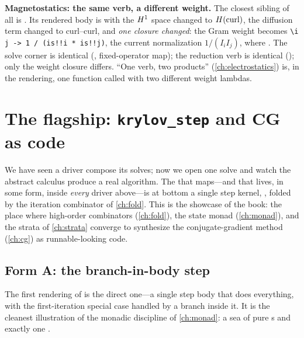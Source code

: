 \begin{notationbox}
\textbf{Magnetostatics: the same verb, a different weight.} The closest sibling of
all is . Its rendered body is  with the
$H^1$ space changed to $H(\mathrm{curl})$, the diffusion term changed to curl--curl, and
\emph{one closure changed}: the Gram weight becomes
\lstinline[style=l4style]|\i j -> 1 / (is!!i * is!!j)|, the current normalization
$1/(I_iI_j)$, where . The solve corner is identical
(, fixed-operator map); the reduction verb is identical
(); only the weight closure differs. ``One verb, two products''
(\cref{ch:electrostatics}) is, in the rendering, one function 
called with two different weight lambdas.
\end{notationbox}

\section{The flagship: \texttt{krylov\_step} and CG as code}
\label{sec:cg-flagship}

We have seen a driver compose its solves; now we open one solve and watch the
abstract calculus produce a real algorithm. The  that
 maps---and that lives, in some form, inside \emph{every} driver
above---is at bottom a single step kernel, , folded by the
iteration combinator of \cref{ch:fold}. This is the showcase of the book: the place
where high-order combinators (\cref{ch:fold}), the state monad (\cref{ch:monad}),
and the strata of \cref{ch:strata} converge to synthesize the conjugate-gradient
method (\cref{ch:cg}) as runnable-looking code.

\subsection{Form A: the branch-in-body step}

The first rendering of  is the direct one---a single step body
that does everything, with the first-iteration special case handled by a branch
inside it. It is the cleanest illustration of the monadic discipline of
\cref{ch:monad}: a sea of pure s and exactly one .

